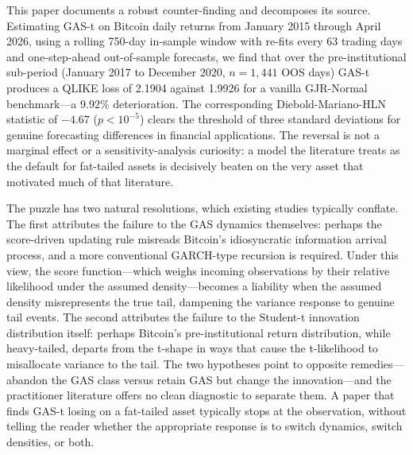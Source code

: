 This paper documents a robust counter-finding and decomposes its source. Estimating GAS-t on Bitcoin daily returns from January 2015 through April 2026, using a rolling 750-day in-sample window with re-fits every 63 trading days and one-step-ahead out-of-sample forecasts, we find that over the pre-institutional sub-period (January 2017 to December 2020, $n = 1{,}441$ OOS days) GAS-t produces a QLIKE loss of 2.1904 against 1.9926 for a vanilla GJR-Normal benchmark---a 9.92\% deterioration. The corresponding Diebold-Mariano-HLN statistic of $-4.67$ ($p < 10^{-5}$) clears the \citet{harvey2016} threshold of three standard deviations for genuine forecasting differences in financial applications. The reversal is not a marginal effect or a sensitivity-analysis curiosity: a model the literature treats as the default for fat-tailed assets is decisively beaten on the very asset that motivated much of that literature.

The puzzle has two natural resolutions, which existing studies typically conflate. The first attributes the failure to the GAS dynamics themselves: perhaps the score-driven updating rule misreads Bitcoin's idiosyncratic information arrival process, and a more conventional GARCH-type recursion is required. Under this view, the score function---which weighs incoming observations by their relative likelihood under the assumed density---becomes a liability when the assumed density misrepresents the true tail, dampening the variance response to genuine tail events. The second attributes the failure to the Student-t innovation distribution itself: perhaps Bitcoin's pre-institutional return distribution, while heavy-tailed, departs from the t-shape in ways that cause the t-likelihood to misallocate variance to the tail. The two hypotheses point to opposite remedies---abandon the GAS class versus retain GAS but change the innovation---and the practitioner literature offers no clean diagnostic to separate them. A paper that finds GAS-t losing on a fat-tailed asset typically stops at the observation, without telling the reader whether the appropriate response is to switch dynamics, switch densities, or both.

